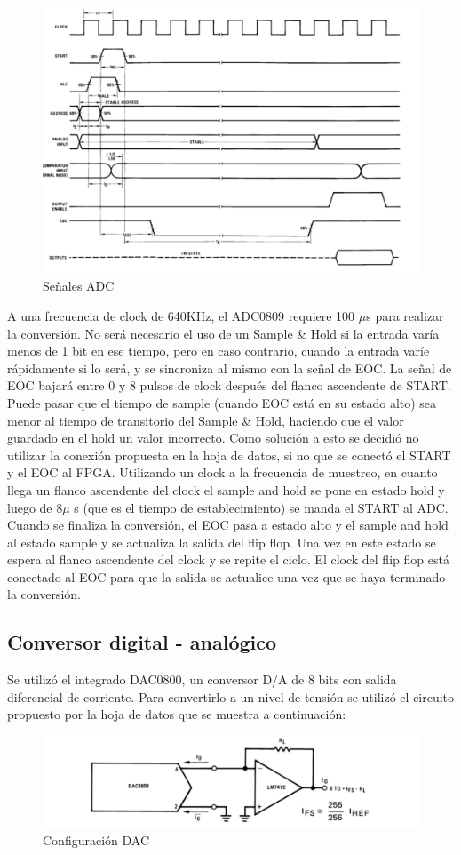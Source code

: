 \documentclass[assd_tp3_main.tex]{subfiles}
\begin{document}
\begin{figure}[H]
	\centering
	\includegraphics[width=0.4 \textwidth]
	{images/ej1/adcsignals.png}
	\caption{Señales ADC}
	\label{fig:ADC}
\end{figure}

A una frecuencia de clock de 640KHz, el ADC0809 requiere 100 $\mu$s para realizar la conversión. No será necesario el uso de un Sample \& Hold si la entrada varía menos de 1 bit en ese tiempo, pero en caso contrario, cuando la entrada varíe rápidamente si lo será, y se sincroniza al mismo con la señal de EOC. La señal de EOC bajará entre 0 y 8 pulsos de clock después del flanco ascendente de START. Puede pasar que el tiempo de sample (cuando EOC está en su estado alto) sea menor al tiempo de transitorio del Sample \& Hold, haciendo que el valor guardado en
el hold un valor incorrecto.
Como solución a esto se decidió no utilizar la conexión propuesta en la hoja de datos,
si no que se conectó el START y el EOC al FPGA. Utilizando un clock a la frecuencia de
muestreo, en cuanto llega un flanco ascendente del clock el sample and hold se pone
en estado hold y luego de 8$\mu$ s (que es el tiempo de establecimiento) se manda el
START al ADC. Cuando se finaliza la conversión, el EOC pasa a estado alto y el sample
and hold al estado sample y se actualiza la salida del flip flop. Una vez en este estado
se espera al flanco ascendente del clock y se repite el ciclo.
El clock del flip flop está conectado al EOC para que la salida se actualice una vez que
se haya terminado la conversión. 

\subsection{Conversor digital - analógico}

Se utilizó el integrado DAC0800, un conversor D/A de 8 bits con salida diferencial de
corriente. Para convertirlo a un nivel de tensión se utilizó el circuito propuesto por la
hoja de datos que se muestra a continuación:

\begin{figure}[H]
	\centering
	\includegraphics[width=0.6 \textwidth]
	{images/ej1/dac.png}
	\caption{Configuración DAC}
	\label{fig:DAC}
\end{figure}
\end{document}
